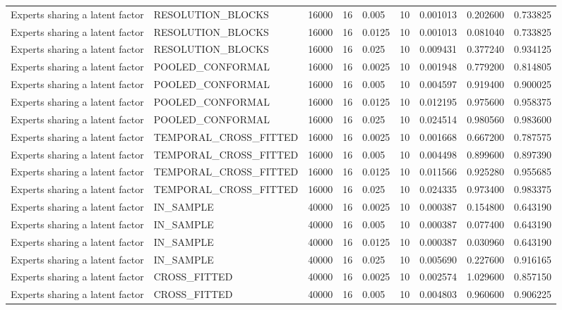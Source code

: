 \begin{tabular}{lllllllll}
Experts sharing a latent factor & RESOLUTION\_BLOCKS & 16000 & 16 & 0.005 & 10 & 0.001013 & 0.202600 & 0.733825 \\
Experts sharing a latent factor & RESOLUTION\_BLOCKS & 16000 & 16 & 0.0125 & 10 & 0.001013 & 0.081040 & 0.733825 \\
Experts sharing a latent factor & RESOLUTION\_BLOCKS & 16000 & 16 & 0.025 & 10 & 0.009431 & 0.377240 & 0.934125 \\
Experts sharing a latent factor & POOLED\_CONFORMAL & 16000 & 16 & 0.0025 & 10 & 0.001948 & 0.779200 & 0.814805 \\
Experts sharing a latent factor & POOLED\_CONFORMAL & 16000 & 16 & 0.005 & 10 & 0.004597 & 0.919400 & 0.900025 \\
Experts sharing a latent factor & POOLED\_CONFORMAL & 16000 & 16 & 0.0125 & 10 & 0.012195 & 0.975600 & 0.958375 \\
Experts sharing a latent factor & POOLED\_CONFORMAL & 16000 & 16 & 0.025 & 10 & 0.024514 & 0.980560 & 0.983600 \\
Experts sharing a latent factor & TEMPORAL\_CROSS\_FITTED & 16000 & 16 & 0.0025 & 10 & 0.001668 & 0.667200 & 0.787575 \\
Experts sharing a latent factor & TEMPORAL\_CROSS\_FITTED & 16000 & 16 & 0.005 & 10 & 0.004498 & 0.899600 & 0.897390 \\
Experts sharing a latent factor & TEMPORAL\_CROSS\_FITTED & 16000 & 16 & 0.0125 & 10 & 0.011566 & 0.925280 & 0.955685 \\
Experts sharing a latent factor & TEMPORAL\_CROSS\_FITTED & 16000 & 16 & 0.025 & 10 & 0.024335 & 0.973400 & 0.983375 \\
Experts sharing a latent factor & IN\_SAMPLE & 40000 & 16 & 0.0025 & 10 & 0.000387 & 0.154800 & 0.643190 \\
Experts sharing a latent factor & IN\_SAMPLE & 40000 & 16 & 0.005 & 10 & 0.000387 & 0.077400 & 0.643190 \\
Experts sharing a latent factor & IN\_SAMPLE & 40000 & 16 & 0.0125 & 10 & 0.000387 & 0.030960 & 0.643190 \\
Experts sharing a latent factor & IN\_SAMPLE & 40000 & 16 & 0.025 & 10 & 0.005690 & 0.227600 & 0.916165 \\
Experts sharing a latent factor & CROSS\_FITTED & 40000 & 16 & 0.0025 & 10 & 0.002574 & 1.029600 & 0.857150 \\
Experts sharing a latent factor & CROSS\_FITTED & 40000 & 16 & 0.005 & 10 & 0.004803 & 0.960600 & 0.906225 \\

\end{tabular}
